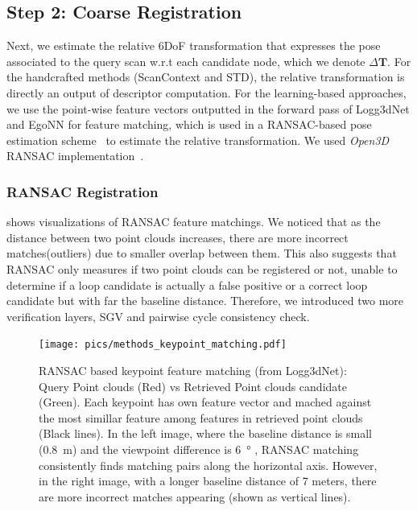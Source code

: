 \subsection*{\textbf{Step 2: Coarse Registration}}
\label{subsubsec:coarse-registration}
Next, we estimate the relative 6DoF transformation that expresses the pose associated to the query scan w.r.t each candidate node, which we denote $\Delta \mathbf{T}$. For the handcrafted methods (ScanContext and STD), the relative transformation is directly an output of descriptor computation. For the learning-based approaches, we use the point-wise feature vectors outputted in the forward pass of Logg3dNet and EgoNN for feature matching, which is used in a RANSAC-based pose estimation scheme~\cite{fischler1981ransac} to estimate the relative transformation. We used \emph{Open3D} RANSAC implementation~\cite{zhou2018}.  

\subsubsection*{\textbf{RANSAC Registration}}
 shows visualizations of RANSAC feature matchings. We noticed that as the distance between two point clouds increases, there are more incorrect matches(outliers) due to smaller overlap between them. This also suggests that RANSAC only measures if two point clouds can be registered or not, unable to determine if a loop candidate is actually a false positive or a correct loop candidate but with far the baseline distance. Therefore, we introduced two more verification layers, SGV and pairwise cycle consistency check. 

\begin{figure}[t]
  \centering
  \texttt{[image: pics/methods\_keypoint\_matching.pdf]}
  \caption{RANSAC based keypoint feature matching (from Logg3dNet): Query Point clouds (Red) vs Retrieved Point clouds candidate (Green). Each keypoint has own feature vector and mached against the most simillar feature among features in retrieved point clouds (Black lines). In the left image, where the baseline distance is small (\SI{0.8}{\meter}) and the viewpoint difference is \SI{6}{\degree} , RANSAC matching consistently finds matching pairs along the horizontal axis. However, in the right image, with a longer baseline distance of 7 meters, there are more incorrect matches appearing (shown as vertical lines).   }
  \label{fig:RANSAC_keypoint_matching}
\end{figure}

